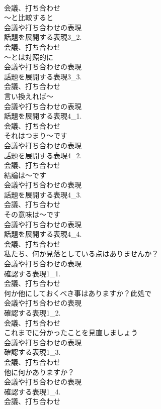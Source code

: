 \documentclass[8pt]{extreport}
\begin{document}
\begin{CJK}{UTF8}{min}
\\	会議、打ち合わせ
\\	～と比較すると	
\\	会議や打ち合わせの表現
\\	話題を展開する表現3_2.
\\	会議、打ち合わせ
\\	～とは対照的に	
\\	会議や打ち合わせの表現
\\	話題を展開する表現3_3.
\\	会議、打ち合わせ
\\	言い換えれば～	
\\	会議や打ち合わせの表現
\\	話題を展開する表現4_1.
\\	会議、打ち合わせ
\\	それはつまり～です	
\\	会議や打ち合わせの表現
\\	話題を展開する表現4_2.
\\	会議、打ち合わせ
\\	結論は～です	
\\	会議や打ち合わせの表現
\\	話題を展開する表現4_3.
\\	会議、打ち合わせ
\\	その意味は～です	
\\	会議や打ち合わせの表現
\\	話題を展開する表現4_4.
\\	会議、打ち合わせ
\\	私たち、何か見落としている点はありませんか？	
\\	会議や打ち合わせの表現
\\	確認する表現1_1.
\\	会議、打ち合わせ
\\	何か他にしておくべき事はありますか？此処で	
\\	会議や打ち合わせの表現
\\	確認する表現1_2.
\\	会議、打ち合わせ
\\	これまでに分かったことを見直しましょう	
\\	会議や打ち合わせの表現
\\	確認する表現1_3.
\\	会議、打ち合わせ
\\	他に何かありますか？	
\\	会議や打ち合わせの表現
\\	確認する表現1_4.
\\	会議、打ち合わせ

\end{CJK}
\end{document}
